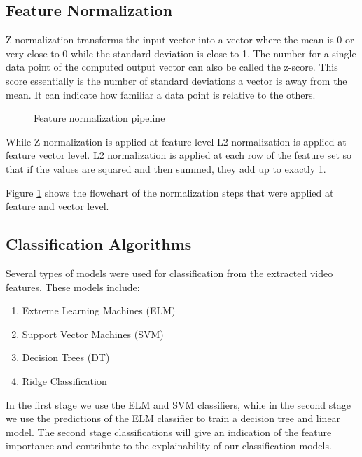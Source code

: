 \subsection{Feature Normalization}
\label{subsection:normalization}
Z normalization transforms the input vector into a vector where the mean is 0 or very close to 0 while the standard deviation is close to 1. The number for a single data point of the computed output vector can also be called the z-score. This score essentially is the number of standard deviations a vector is away from the mean. It can indicate how familiar a data point is relative to the others. 

\begin{figure}[h]
  \centering
  
  \caption{Feature normalization pipeline}
  \label{fig:normpipeline}
\end{figure}

While Z normalization is applied at feature level L2 normalization is applied at feature vector level. L2 normalization is applied at each row of the feature set so that if the values are squared and then summed, they add up to exactly 1. 

Figure \ref{fig:normpipeline} shows the flowchart of the normalization steps that were applied at feature and vector level. 



\subsection{Classification Algorithms}
\label{subsection:classificaiton}
Several types of models were used for classification from the extracted video features. These models include:
\begin{enumerate}
\item Extreme Learning Machines (ELM)
\item Support Vector Machines (SVM)
\item Decision Trees (DT)
\item Ridge Classification
\end{enumerate}
In the first stage we use the ELM and SVM classifiers, while in the second stage we use the predictions of the ELM classifier to train a decision tree and linear model. The second stage classifications will give an indication of the feature importance and contribute to the explainability of our classification models. 

